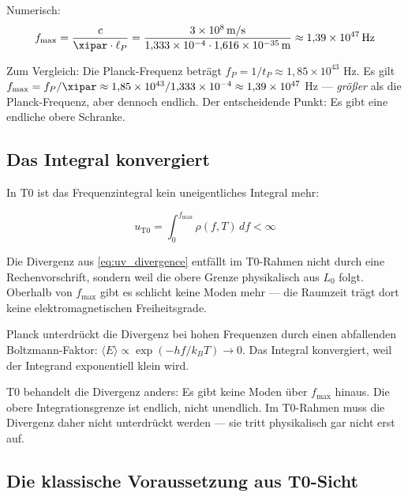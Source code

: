 Numerisch:
\begin{equation}
    f_{\max} = \frac{c}{\xipar \cdot \ell_P} 
    = \frac{3 \times 10^8 \, \text{m/s}}{1{,}333 \times 10^{-4} \cdot 1{,}616 \times 10^{-35} \, \text{m}}
    \approx 1{,}39 \times 10^{47} \, \text{Hz}
    \label{eq:f_max_numerical}
\end{equation}

Zum Vergleich: Die Planck-Frequenz beträgt 
$f_P = 1/t_P \approx 1{,}85 \times 10^{43}$ Hz. 
Es gilt $f_{\max} = f_P / \xipar \approx 1{,}85 \times 10^{43} / 1{,}333 \times 10^{-4} 
\approx 1{,}39 \times 10^{47}$ Hz — \emph{größer} als die Planck-Frequenz, aber dennoch 
endlich. Der entscheidende Punkt: Es gibt eine endliche obere Schranke.

\subsection{Das Integral konvergiert}

In T0 ist das Frequenzintegral kein uneigentliches Integral mehr:

\begin{equation}
    u_{\text{T0}} = \int_0^{f_{\max}} \rho(f, T) \, df < \infty
    \label{eq:t0_convergent_integral}
\end{equation}

Die Divergenz aus \eqref{eq:uv_divergence} entfällt im T0-Rahmen nicht durch eine 
Rechenvorschrift, sondern weil die obere Grenze physikalisch aus $L_0$ folgt. 
Oberhalb von $f_{\max}$ gibt es schlicht keine Moden mehr — die Raumzeit trägt 
dort keine elektromagnetischen Freiheitsgrade.

\begin{important}
    Planck unterdrückt die Divergenz bei hohen Frequenzen durch einen abfallenden 
    Boltzmann-Faktor: $\langle E \rangle \propto \exp(-hf/k_BT) \to 0$. 
    Das Integral konvergiert, weil der Integrand exponentiell klein wird.
    
    T0 behandelt die Divergenz anders: Es gibt keine Moden über 
    $f_{\max}$ hinaus. Die obere Integrationsgrenze ist endlich, nicht unendlich. 
    Im T0-Rahmen muss die Divergenz daher nicht unterdrückt werden — 
    sie tritt physikalisch gar nicht erst auf.
\end{important}

\subsection{Die klassische Voraussetzung aus T0-Sicht}

